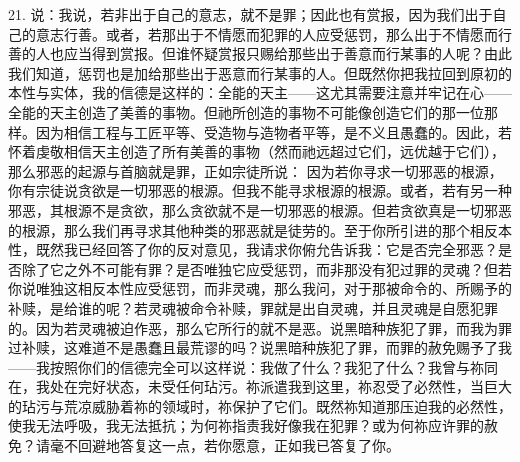 21. 说：我说，若非出于自己的意志，就不是罪；因此也有赏报，因为我们出于自己的意志行善。或者，若那出于不情愿而犯罪的人应受惩罚，那么出于不情愿而行善的人也应当得到赏报。但谁怀疑赏报只赐给那些出于善意而行某事的人呢？由此我们知道，惩罚也是加给那些出于恶意而行某事的人。但既然你把我拉回到原初的本性与实体，我的信德是这样的：全能的天主——这尤其需要注意并牢记在心——全能的天主创造了美善的事物。但祂所创造的事物不可能像创造它们的那一位那样。因为相信工程与工匠平等、受造物与造物者平等，是不义且愚蠢的。因此，若怀着虔敬相信天主创造了所有美善的事物（然而祂远超过它们，远优越于它们），那么邪恶的起源与首脑就是罪，正如宗徒所说： 因为若你寻求一切邪恶的根源，你有宗徒说贪欲是一切邪恶的根源。但我不能寻求根源的根源。或者，若有另一种邪恶，其根源不是贪欲，那么贪欲就不是一切邪恶的根源。但若贪欲真是一切邪恶的根源，那么我们再寻求其他种类的邪恶就是徒劳的。至于你所引进的那个相反本性，既然我已经回答了你的反对意见，我请求你俯允告诉我：它是否完全邪恶？是否除了它之外不可能有罪？是否唯独它应受惩罚，而非那没有犯过罪的灵魂？但若你说唯独这相反本性应受惩罚，而非灵魂，那么我问，对于那被命令的、所赐予的补赎，是给谁的呢？若灵魂被命令补赎，罪就是出自灵魂，并且灵魂是自愿犯罪的。因为若灵魂被迫作恶，那么它所行的就不是恶。说黑暗种族犯了罪，而我为罪过补赎，这难道不是愚蠢且最荒谬的吗？说黑暗种族犯了罪，而罪的赦免赐予了我——我按照你们的信德完全可以这样说：我做了什么？我犯了什么？我曾与祢同在，我处在完好状态，未受任何玷污。祢派遣我到这里，祢忍受了必然性，当巨大的玷污与荒凉威胁着祢的领域时，祢保护了它们。既然祢知道那压迫我的必然性，使我无法呼吸，我无法抵抗；为何祢指责我好像我在犯罪？或为何祢应许罪的赦免？请毫不回避地答复这一点，若你愿意，正如我已答复了你。\par

